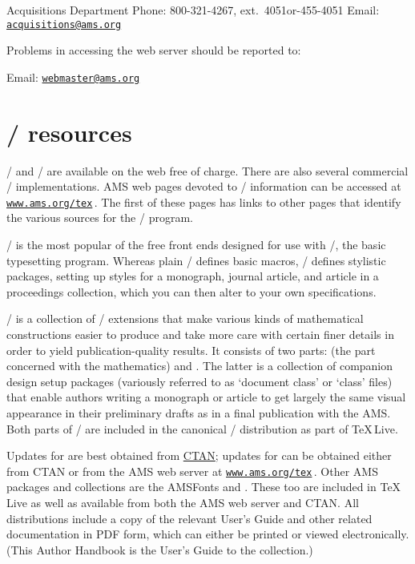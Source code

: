\beginexample{\rm}
Acquisitions Department
Phone: 800-321-4267, ext.\ 4051\quad or-455-4051
Email: \href{mailto:acquisitions@ams.org}{\texttt{acquisitions@ams.org}}
\endexample
\fi\fi

\medskip
Problems in accessing the web server should be reported to:

\beginexample{\rm}
Email: \href{mailto:webmaster@ams.org}{\texttt{webmaster@ams.org}}
\endexample


\section{\texorpdfstring{\protect\tex/}{TeX} resources}
\label{ch:texresources}

\latex/ and \tex/ are available on the web free of charge.
There are also several commercial \tex/ implementations.
AMS web pages devoted to \tex/ information can be accessed at
\href{http://www.ams.org/tex}{\texttt{www.ams.org/tex}}\,.
The first of these pages has links to other
pages that identify the various sources for the \tex/ program.

\latex/ is the most popular of the free front ends designed for use
with \tex/, the basic typesetting program.  Whereas plain \tex/
defines basic macros, \latex/ defines stylistic packages, setting up
styles for a monograph, journal article, and article in a proceedings
collection, which you can then alter to your own specifications.

\amslatex/ is a collection of \latex/ extensions that make various
kinds of mathematical constructions easier to produce and take more
care with certain finer details in order to yield publication-quality
results.  It consists of two parts:  (the part concerned
with the mathematics) and .
The latter is a collection of companion design
setup packages (variously referred to as `document class' or `class' files)
 that enable authors writing a monograph or article to
get largely the same visual appearance in their preliminary drafts as
in a final publication with the AMS\@.  Both parts of \amslatex/ are
included in the canonical \latex/ distribution as part of \TeX\,Live.

Updates for  are best obtained from
\href{http://www.ctan.org/search.html}{CTAN};
updates for  can be obtained either from CTAN or from the
AMS web server at
\href{http://www.ams.org/tex}{\texttt{www.ams.org/tex}}\,.
Other AMS packages and collections are the AMSFonts and .
These too are included in \TeX\,Live as well as available from both
the AMS web server and CTAN\@.  All distributions include a copy of
the relevant User's Guide and other related documentation in PDF form,
which can either be printed or viewed electronically.  (This
Author Handbook is the User's Guide to the  collection.)

